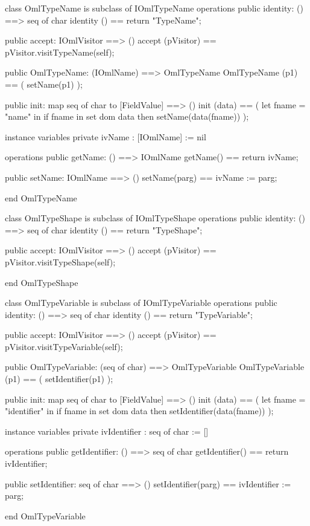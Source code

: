 \begin{vdm_al}
class OmlTypeName is subclass of IOmlTypeName
operations
  public identity: () ==> seq of char
  identity () == return "TypeName";

  public accept: IOmlVisitor ==> ()
  accept (pVisitor) == pVisitor.visitTypeName(self);

  public OmlTypeName:
      (IOmlName) ==> OmlTypeName
  OmlTypeName (p1) == 
   ( setName(p1) );

  public init: map seq of char to [FieldValue] ==> ()
  init (data) ==
    ( let fname = "name" in
        if fname in set dom data
        then setName(data(fname)) );

instance variables
  private ivName : [IOmlName] := nil

operations
  public getName: () ==> IOmlName
  getName() == return ivName;

  public setName: IOmlName ==> ()
  setName(parg) == ivName := parg;

end OmlTypeName
\end{vdm_al}

\begin{vdm_al}
class OmlTypeShape is subclass of IOmlTypeShape
operations
  public identity: () ==> seq of char
  identity () == return "TypeShape";

  public accept: IOmlVisitor ==> ()
  accept (pVisitor) == pVisitor.visitTypeShape(self);

end OmlTypeShape
\end{vdm_al}
\begin{vdm_al}
class OmlTypeVariable is subclass of IOmlTypeVariable
operations
  public identity: () ==> seq of char
  identity () == return "TypeVariable";

  public accept: IOmlVisitor ==> ()
  accept (pVisitor) == pVisitor.visitTypeVariable(self);

  public OmlTypeVariable:
      (seq of char) ==> OmlTypeVariable
  OmlTypeVariable (p1) == 
   ( setIdentifier(p1) );

  public init: map seq of char to [FieldValue] ==> ()
  init (data) ==
    ( let fname = "identifier" in
        if fname in set dom data
        then setIdentifier(data(fname)) );

instance variables
  private ivIdentifier : seq of char := []

operations
  public getIdentifier: () ==> seq of char
  getIdentifier() == return ivIdentifier;

  public setIdentifier: seq of char ==> ()
  setIdentifier(parg) == ivIdentifier := parg;

end OmlTypeVariable
\end{vdm_al}

